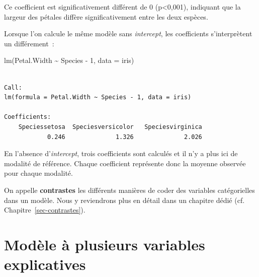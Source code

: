 \documentclass[
  letterpaper,
  DIV=11,
  numbers=noendperiod,
  oneside]{scrreprt}
\newenvironment{Shaded}{\begin{snugshade}}{\end{snugshade}}
\newcommand{\AttributeTok}[1]{\textcolor[rgb]{0.40,0.45,0.13}{#1}}
\newcommand{\DecValTok}[1]{\textcolor[rgb]{0.68,0.00,0.00}{#1}}
\newcommand{\FunctionTok}[1]{\textcolor[rgb]{0.28,0.35,0.67}{#1}}
\newcommand{\NormalTok}[1]{\textcolor[rgb]{0.00,0.23,0.31}{#1}}
\newcommand{\SpecialCharTok}[1]{\textcolor[rgb]{0.37,0.37,0.37}{#1}}
\begin{document}
Ce coefficient est significativement différent de 0 (p\textless0,001),
indiquant que la largeur des pétales diffère significativement entre les
deux espèces.

\begin{tcolorbox}[enhanced jigsaw, colbacktitle=quarto-callout-tip-color!10!white, opacityback=0, toprule=.15mm, colback=white, coltitle=black, bottomtitle=1mm, toptitle=1mm, titlerule=0mm, rightrule=.15mm, title=\textcolor{quarto-callout-tip-color}{\faLightbulb}\hspace{0.5em}{Astuce}, breakable, bottomrule=.15mm, opacitybacktitle=0.6, arc=.35mm, left=2mm, leftrule=.75mm, colframe=quarto-callout-tip-color-frame]

Lorsque l'on calcule le même modèle sans \emph{intercept}, les
coefficients s'interprètent un différement~:

\begin{Shaded}
\begin{Highlighting}[]
\FunctionTok{lm}\NormalTok{(Petal.Width }\SpecialCharTok{\textasciitilde{}}\NormalTok{ Species }\SpecialCharTok{{-}} \DecValTok{1}\NormalTok{, }\AttributeTok{data =}\NormalTok{ iris)}
\end{Highlighting}
\end{Shaded}

\begin{verbatim}

Call:
lm(formula = Petal.Width ~ Species - 1, data = iris)

Coefficients:
    Speciessetosa  Speciesversicolor   Speciesvirginica  
            0.246              1.326              2.026  
\end{verbatim}

En l'absence d'\emph{intercept}, trois coefficients sont calculés et il
n'y a plus ici de modalité de référence. Chaque coefficient représente
donc la moyenne observée pour chaque modalité.

On appelle \textbf{contrastes} les différents manières de coder des
variables catégorielles dans un modèle. Nous y reviendrons plus en
détail dans un chapitre dédié (cf. Chapitre~\ref{sec-contrastes}).

\end{tcolorbox}

\hypertarget{sec-regression-lineaire-multivariee}{%
\section{Modèle à plusieurs variables
explicatives}\label{sec-regression-lineaire-multivariee}}
\end{document}
